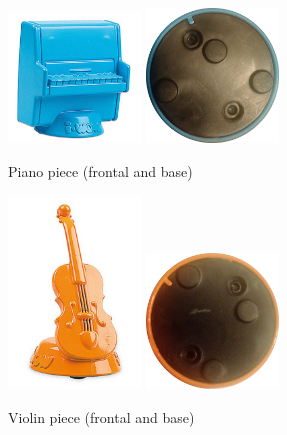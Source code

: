 \begin{figure}[ht!]
	\centering
	\includegraphics[width=100pt]{graphics/architecture/pieces/pieceKeyboards.jpg}
	\vspace{0.6cm}
	\includegraphics[width=100pt]{graphics/architecture/pieces/keyboardsBase.png}
	\caption{Piano piece (frontal and base)}
	\label{fig:keyboardspiece}
\end{figure}

\begin{figure}[ht!]
	\centering
	\includegraphics[width=100pt]{graphics/architecture/pieces/pieceStrings.jpg}
	\vspace{0.6cm}
	\includegraphics[width=100pt]{graphics/architecture/pieces/stringsBase.png}
	\caption{Violin piece (frontal and base)}
	\label{fig:stringspiece}
\end{figure}

